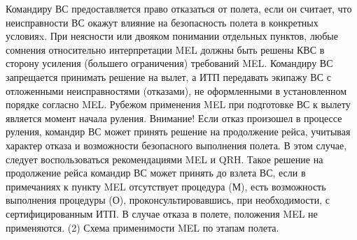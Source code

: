 Командиру ВС предоставляется право отказаться от полета, если он считает, что неисправности ВС окажут влияние на безопасность полета в конкретных условияx.
При неясности или двояком понимании отдельных пунктов, любые сомнения относительно интерпретации MEL должны быть решены КВС в сторону усиления (большего ограничения) требований MEL.
Командиру ВС запрещается принимать решение на вылет, а ИТП передавать экипажу ВС с отложенными неисправностями (отказами), не оформленными в установленном порядке согласно MEL.
Рубежом применения MEL при подготовке ВС к вылету является момент начала руления.
Внимание!
Если отказ произошел в процессе руления, командир ВС может принять решение на продолжение рейса, учитывая характер отказа и возможности безопасного выполнения полета. В этом случае, следует воспользоваться рекомендациями MEL и QRH. Такое решение на продолжение рейса командир ВС может принять до взлета ВС, если в примечаниях к пункту MEL отсутствует процедура (М), есть возможность выполнения процедуры (О), проконсультировавшись, при необходимости, с сертифицированным ИТП.
В случае отказа в полете, положения MEL не применяются. 
(2) Схема применимости MEL по этапам полета.
 
